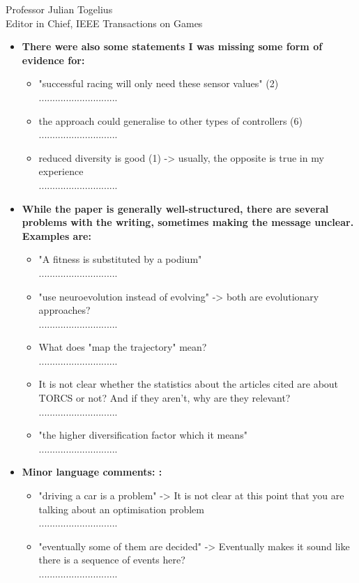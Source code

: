 \documentclass[10pt]{letter} %
\begin{document}
\begin{letter}{Professor Julian Togelius \\ Editor in Chief, IEEE Transactions on Games}
\begin{enumerate}
\begin{itemize}
		\item {\bf There were also some statements I was missing some form of evidence for:}
			\begin{itemize}
			\item	"successful racing will only need these sensor values" (2)\\
.............................
			\item	the approach could generalise to other types of controllers (6)\\
.............................
			\item	reduced diversity is good (1) -> usually, the opposite is true in my experience\\
.............................
			\end{itemize}

		\item {\bf 	While the paper is generally well-structured, there are several problems with the writing, sometimes making the message unclear. Examples are:}
			\begin{itemize}
			\item "A fitness is substituted by a podium"\\
.............................
			\item "use neuroevolution instead of evolving" -> both are evolutionary approaches?\\
.............................
			\item What does "map the trajectory" mean?\\
.............................
			\item It is not clear whether the statistics about the articles cited are about TORCS or not? And if they aren't, why are they relevant?\\
.............................
			\item "the higher diversification factor which it means"\\
.............................
			\end{itemize}
	

	\item {\bf Minor language comments: :} 
				\begin{itemize}
				\item 	"driving a car is a problem" -> It is not clear at this point that you are talking about an optimisation problem\\
.............................
				\item 	"eventually some of them are decided" -> Eventually makes it sound like there is a sequence of events here?\\
.............................
	


\end{itemize}
\end{itemize}
\end{enumerate}
\end{letter}
\end{document}
